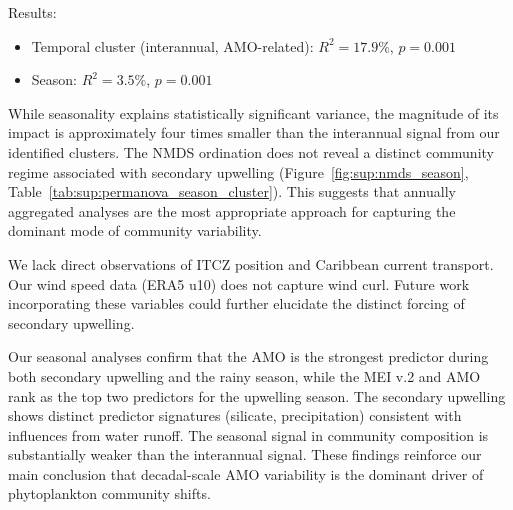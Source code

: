 \documentclass[12pt,english]{reviewresponse}
\begin{document}
\begin{revresponse}
    Results:
    \begin{itemize}
        \item Temporal cluster (interannual, AMO-related): $R^2 = 17.9\%$, $p = 0.001$
        \item Season: $R^2 = 3.5\%$, $p = 0.001$
    \end{itemize}
    
    While seasonality explains statistically significant variance, the magnitude of its impact is approximately four times smaller than the interannual signal from our identified clusters. The NMDS ordination does not reveal a distinct community regime associated with secondary upwelling (Figure~\ref{fig:sup:nmds_season}, Table~\ref{tab:sup:permanova_season_cluster}). This suggests that annually aggregated analyses are the most appropriate approach for capturing the dominant mode of community variability.
    
    We lack direct observations of ITCZ position and Caribbean current transport. Our wind speed data (ERA5 u10) does not capture wind curl. Future work incorporating these variables could further elucidate the distinct forcing of secondary upwelling.

    Our seasonal analyses confirm that the AMO is the strongest predictor during both secondary upwelling and the rainy season, while the MEI v.2 and AMO rank as the top two predictors for the upwelling season. The secondary upwelling shows distinct predictor signatures (silicate, precipitation) consistent with influences from water runoff. The seasonal signal in community composition is substantially weaker than the interannual signal. These findings reinforce our main conclusion that decadal-scale AMO variability is the dominant driver of phytoplankton community shifts.
\end{revresponse}
\end{document}
